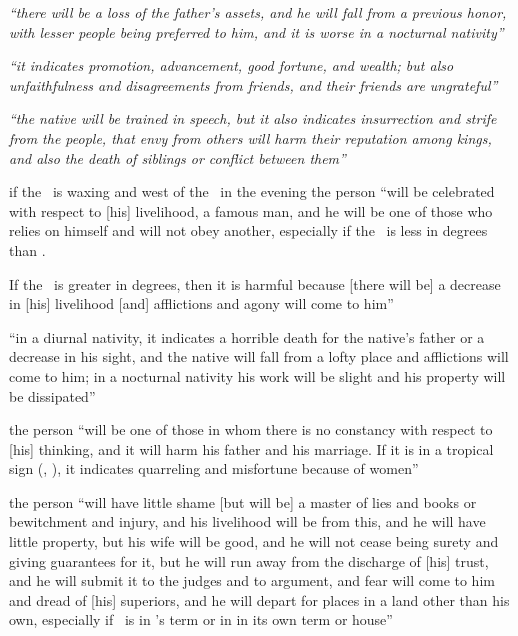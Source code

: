 \begin{description}[style=multiline,leftmargin=1.5cm]
\item[\Jupiter\Opposition\Sun] \textsl{``there will be a loss of the father's assets, and he will fall from a previous honor, with lesser people being preferred to him, and it is worse in a nocturnal nativity''}

\item[\Jupiter\Opposition\Venus] \textsl{``it indicates promotion, advancement, good fortune, and wealth; but also unfaithfulness and disagreements from friends, and their friends are ungrateful''}

\item[\Jupiter\Opposition\Mercury] \textsl{``the native will be trained in speech, but it also indicates insurrection and strife from the people, that envy from others will harm their reputation among kings, and also the death of siblings or conflict between them''}

\item[\Jupiter\Opposition\Moon] if the \Moon\, is waxing and west of the \Sun\, in the evening the person ``will be celebrated with respect to [his] livelihood, a famous man, and he will be one of those who relies on himself and will not obey another, especially if the \Moon\, is less in degrees than \Jupiter. 

If the \Moon\, is greater in degrees, then it is harmful because [there will be] a decrease in [his] livelihood [and] afflictions and agony will come to him''

\item[\Mars\Opposition\Sun] ``in a diurnal nativity, it indicates a horrible death for the native's father or a decrease in his sight, and the native will fall from a lofty place and afflictions will come to him; in a nocturnal nativity his work will be slight and his property will be dissipated''

\item[\Mars\Opposition\Venus] the person ``will be one of those in whom there is no constancy with respect to [his] thinking, and it will harm his father and his marriage. If it is in a tropical sign (\Cancer, \Capricorn), it indicates quarreling and misfortune because of women''

\item[\Mars\Opposition\Mercury] the person ``will have little shame [but will be] a master of lies and books or bewitchment and injury, and his livelihood will be from this, and he will have little property, but his wife will be good, and he will not cease being surety and giving guarantees for it, but he will run away from the discharge of [his] trust, and he will submit it to the judges and to argument, and fear will come to him and dread of [his] superiors, and he will depart for places in a land other than his own, especially if \Mercury\, is in \Saturn's term or in in its own term or house''


\end{description}

